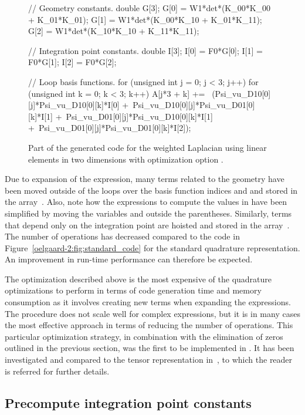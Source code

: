 \begin{figure}
\bwfig
\begin{c++}
// Geometry constants.
double G[3];
G[0] = W1*det*(K_00*K_00 + K_01*K_01);
G[1] = W1*det*(K_00*K_10 + K_01*K_11);
G[2] = W1*det*(K_10*K_10 + K_11*K_11);

// Integration point constants.
double I[3];
I[0] = F0*G[0];
I[1] = F0*G[1];
I[2] = F0*G[2];

// Loop basis functions.
for (unsigned int j = 0; j < 3; j++)
{
 for (unsigned int k = 0; k < 3; k++)
 {
  A[j*3 + k] += \
    (Psi_vu_D10[0][j]*Psi_vu_D10[0][k]*I[0] +\
     Psi_vu_D10[0][j]*Psi_vu_D01[0][k]*I[1] +\
     Psi_vu_D01[0][j]*Psi_vu_D10[0][k]*I[1] +\
     Psi_vu_D01[0][j]*Psi_vu_D01[0][k]*I[2]);
 }
}
\end{c++}
\caption{Part of the generated code for the weighted Laplacian using
  linear elements in two dimensions with optimization option .}
\label{oelgaard-2:fig:O_simplify_code}
\end{figure}

Due to expansion of the expression, many terms related to the geometry
have been moved outside of the loops over the basis function indices
\emp{j} and  and stored in the array~.  Also, note how
the expressions to compute the values in  have been simplified
by moving the variables \emp{det} and \emp{W1} outside the
parentheses.  Similarly, terms that depend only on the integration
point are hoisted and stored in the array~\emp{I}.  The number of
operations has decreased compared to the code in
Figure~\ref{oelgaard-2:fig:standard_code} for the standard quadrature
representation. An improvement in run-time performance can therefore be
expected.

\looseness-1{}The optimization described above is the most expensive of the
quadrature optimizations to perform in terms of \ffc{} code generation
time and memory consumption as it involves creating new terms when
expanding the expressions.  The
procedure does not scale well for complex expressions, but it is in
many cases the most effective approach in terms of reducing the number
of operations.  This particular optimization strategy, in combination
with the elimination of zeros outlined in the previous section, was
the first to be implemented in \ffc{}.  It has been investigated and
compared to the tensor representation in~\citet{OelgaardWells2010}, to
which the reader is referred for further details.

\subsection{Precompute integration point constants}

